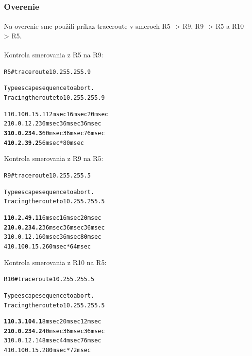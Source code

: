 \documentclass[12pt,twoside,a4paper]{report}
\begin{document}
\subsubsection{Overenie}
\paragraph{}
Na overenie sme použili príkaz traceroute v smeroch R5 -\textgreater{} R9, R9 -\textgreater{} R5 a R10 -\textgreater{} R5.
\paragraph{}

\noindent
Kontrola smerovania  z R5 na R9:
\noindent
{\selectfont
\begin{small}
\begin{alltt}
R5#traceroute 10.255.255.9     

Type escape sequence to abort.
Tracing the route to 10.255.255.9

  1 10.100.15.1 12 msec 16 msec 20 msec
  2 10.0.12.2 36 msec 36 msec 36 msec
  \textbf{3 10.0.234.3} 60 msec 36 msec 76 msec
  \textbf{4 10.2.39.2} 56 msec *  80 msec


\end{alltt}
\end{small}
}

\noindent
Kontrola smerovania  z R9 na R5:
\noindent
{\selectfont
\begin{small}
\begin{alltt}
R9#traceroute 10.255.255.5

Type escape sequence to abort.
Tracing the route to 10.255.255.5

  \textbf{1 10.2.49.1} 16 msec 16 msec 20 msec
  \textbf{2 10.0.234.2} 36 msec 36 msec 36 msec
  3 10.0.12.1 60 msec 36 msec 80 msec
  4 10.100.15.2 60 msec *  64 msec


\end{alltt}
\end{small}
}

\noindent
Kontrola smerovania z R10 na R5:
\noindent
{\selectfont
\begin{small}
\begin{alltt}
R10#traceroute 10.255.255.5

Type escape sequence to abort.
Tracing the route to 10.255.255.5

  \textbf{1 10.3.104.1} 8 msec 20 msec 12 msec
  \textbf{2 10.0.234.2} 40 msec 36 msec 36 msec
  3 10.0.12.1 48 msec 44 msec 76 msec
  4 10.100.15.2 80 msec *  72 msec


\end{alltt}
\end{small}
}
\end{document}
